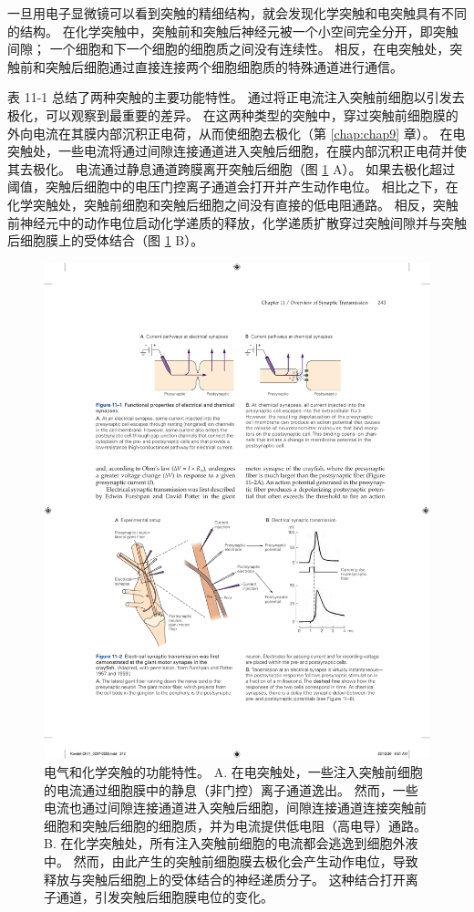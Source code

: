 一旦用电子显微镜可以看到突触的精细结构，就会发现化学突触和电突触具有不同的结构。 
在化学突触中，突触前和突触后神经元被一个小空间完全分开，即突触间隙； 
一个细胞和下一个细胞的细胞质之间没有连续性。 
相反，在电突触处，突触前和突触后细胞通过直接连接两个细胞细胞质的特殊通道进行通信。


表 11-1 总结了两种突触的主要功能特性。 
通过将正电流注入突触前细胞以引发去极化，可以观察到最重要的差异。 
在这两种类型的突触中，穿过突触前细胞膜的外向电流在其膜内部沉积正电荷，从而使细胞去极化（第 \ref{chap:chap9} 章）。 
在电突触处，一些电流将通过间隙连接通道进入突触后细胞，在膜内部沉积正电荷并使其去极化。 
电流通过静息通道跨膜离开突触后细胞（图 \ref{fig:11_1} A）。 
如果去极化超过阈值，突触后细胞中的电压门控离子通道会打开并产生动作电位。 
相比之下，在化学突触处，突触前细胞和突触后细胞之间没有直接的低电阻通路。 
相反，突触前神经元中的动作电位启动化学递质的释放，化学递质扩散穿过突触间隙并与突触后细胞膜上的受体结合（图 \ref{fig:11_1} B）。


\begin{figure}[htbp]
	\centering
	\includegraphics[width=0.6\linewidth]{chap11/fig_11_1}
	\caption{电气和化学突触的功能特性。 A. 在电突触处，一些注入突触前细胞的电流通过细胞膜中的静息（非门控）离子通道逸出。 然而，一些电流也通过间隙连接通道进入突触后细胞，间隙连接通道连接突触前细胞和突触后细胞的细胞质，并为电流提供低电阻（高电导）通路。 B. 在化学突触处，所有注入突触前细胞的电流都会逃逸到细胞外液中。 然而，由此产生的突触前细胞膜去极化会产生动作电位，导致释放与突触后细胞上的受体结合的神经递质分子。 这种结合打开离子通道，引发突触后细胞膜电位的变化。}
	\label{fig:11_1}
\end{figure}

